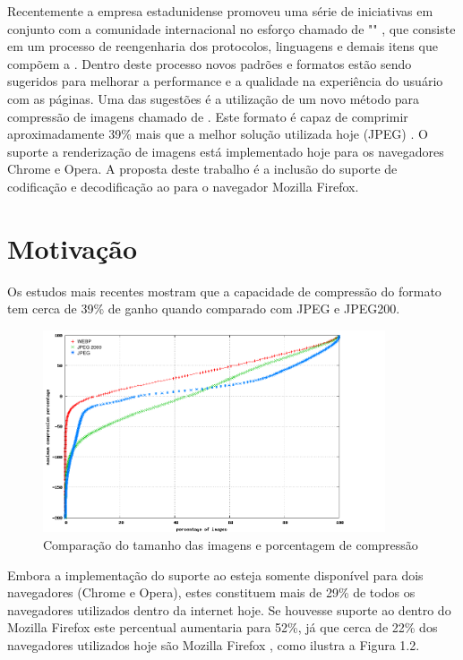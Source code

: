 \documentclass[espaco=simples,appendix=Name]{abnt}
\begin{document}
\begin{description}
Recentemente a empresa estadunidense  promoveu uma série de iniciativas em conjunto com a comunidade internacional no esforço chamado de "" \cite{WebFaster}, que consiste em um processo de reengenharia dos protocolos, linguagens e demais itens que compõem a . Dentro deste processo novos padrões e formatos estão sendo sugeridos para melhorar a performance e a qualidade na experiência do usuário com as páginas. Uma das sugestões é a utilização de um novo método para compressão de imagens chamado de . Este formato é capaz de comprimir aproximadamente 39\% mais que a melhor solução utilizada hoje (JPEG) \cite{WebPStudy}. O suporte a renderização de imagens  está implementado hoje para os navegadores Chrome e Opera. A proposta deste trabalho é a inclusão do suporte de codificação e decodificação ao  para o navegador Mozilla Firefox.

\section{Motivação}

\item \noindent Os estudos mais recentes mostram que a capacidade de compressão do formato  tem cerca de 39\% de ganho quando comparado com JPEG e JPEG200.

\begin{figure}[h]
  \centering
    \includegraphics[width=0.9\textwidth]{Plot3_cdfcompr.png}
  \caption{Comparação do tamanho das imagens e porcentagem de compressão \protect\cite{WebPStudy}}
\end{figure}

Embora a implementação do suporte ao  esteja somente disponível para dois navegadores (Chrome e Opera), estes constituem mais de 29\% de todos os navegadores utilizados dentro da internet hoje. Se houvesse suporte ao  dentro do Mozilla Firefox este percentual aumentaria para 52\%, já que cerca de 22\% dos navegadores utilizados hoje são Mozilla Firefox \cite{BrowserStats}, como ilustra a Figura 1.2.


\end{description}
\end{document}

